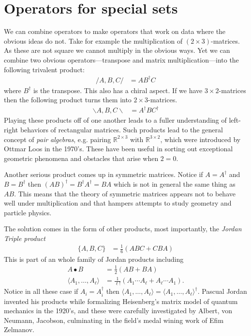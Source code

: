 \section{Operators for special sets}
We can combine operators to make operators that work on data where the 
obvious ideas do not.  Take for example the multiplication of $(2\times 3)$-matrices.
As these are not square we cannot multiply in the obvious ways.  Yet 
we can combine two obvious operators---transpose and matrix multiplication---into  
the following trivalent product:
\begin{align*}
    /A,B,C/ & = AB^{\dagger}C
\end{align*}
where $B^{\dagger}$ is the transpose.  This also has a chiral aspect.  If we have
$3\times 2$-matrices then the following product turns them into $2\times 3$-matrices.
\begin{align*}
    \backslash A,B,C\backslash & = A^{\dagger} B C^{\dagger}
\end{align*}
Playing these products off of one another leads to a fuller understanding of left-right 
behaviors of rectangular matrices.
Such products lead to the general 
concept of \emph{pair algebras}, e.g. pairing $\mathbb{R}^{2\times 3}$ 
with $\mathbb{R}^{3\times 2}$, which were introduced by Ottmar Loos in the 1970's.
  These have been useful in sorting out exceptional geometric 
phenomena and obstacles that arise when $2=0$.


Another serious product comes up 
in symmetric matrices.  Notice if $A=A^{\dagger}$ and $B=B^{\dagger}$
then $(AB)^{\dagger}=B^{\dagger}A^{\dagger}=BA$ which is not in general 
the same thing as $AB$.  This means that the theory of symmetric matrices 
appears not to behave well under multiplication and that hampers attempts 
to study geometry and particle physics.

The solution comes in the form of other products, most importantly, 
the  \emph{Jordan Triple product}
\begin{align*}
    \{A,B,C\} & = \frac{1}{6}(ABC+CBA)
\end{align*}
This is part of an whole family of Jordan products including 
\begin{align*}
    A\bullet B & = \frac{1}{2}(AB+BA)\\
    \langle A_1,\ldots,A_{\ell}\rangle & = \frac{1}{\ell!}(A_1\cdots A_{\ell}+A_{\ell}\cdots A_1).
\end{align*}
Notice in all these case if $A_i=A_i^{\dagger}$ then $\langle A_1,\ldots,A_{\ell}\rangle=
\langle A_1,\ldots,A_{\ell}\rangle^{\dagger}$.  Pascual Jordan invented his products while formalizing 
Heisenberg's matrix model of quantum mechanics in the 1920's, and these were 
carefully investigated by Albert, von Neumann, Jacobson, culminating in the 
field's medal wining work of Efim Zelmanov.


